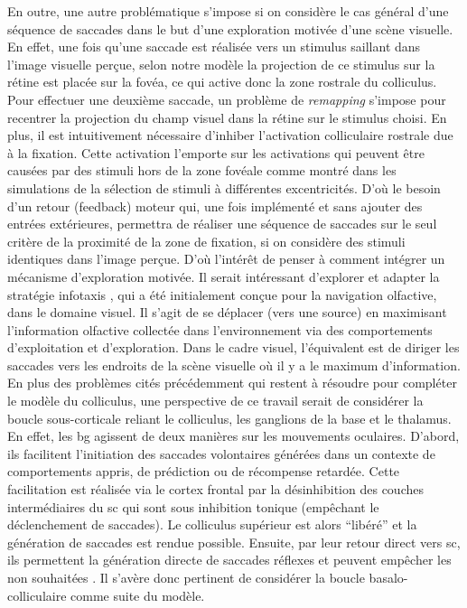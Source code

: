 En outre, une autre problématique s'impose si on considère le cas général d'une séquence de saccades dans le but d'une exploration motivée d'une scène visuelle. En effet, une fois qu'une saccade est réalisée vers un stimulus saillant dans l'image visuelle perçue, selon notre modèle la projection de ce stimulus sur la rétine est placée sur la fovéa, ce qui active donc la zone rostrale du colliculus. Pour effectuer une deuxième saccade, un problème de \textit{remapping} s'impose pour recentrer la projection du champ visuel dans la rétine sur le stimulus choisi. En plus, il est intuitivement nécessaire d'inhiber l'activation colliculaire rostrale due à la fixation. Cette activation l'emporte sur les activations qui peuvent être causées par des stimuli hors de la zone fovéale comme montré dans les simulations de la sélection de stimuli à différentes excentricités. D'o\`u le besoin d'un retour (feedback) moteur qui, une fois implémenté et sans ajouter des entrées extérieures, permettra de réaliser une séquence de saccades sur le seul critère de la proximité de la zone de fixation, si on considère des stimuli identiques dans l'image perçue. D'o\`u l'intérêt de penser à comment intégrer un mécanisme d'exploration motivée. Il serait intéressant d'explorer et adapter la stratégie infotaxis \cite{Vergassola:2007}, qui a été initialement conçue pour la navigation olfactive, dans le domaine visuel. Il s'agit de se déplacer (vers une source) en maximisant l'information olfactive collectée dans l'environnement via des comportements d'exploitation et d'exploration. Dans le cadre visuel, l'équivalent est de diriger les saccades vers les endroits de la scène visuelle o\`u il y a le maximum d'information. \\ %

En plus des problèmes cités précédemment qui restent à résoudre pour compléter le modèle du colliculus, une perspective de ce travail serait de considérer la boucle sous-corticale reliant le colliculus, les ganglions de la base et le thalamus. En effet, les \gls{bg} agissent de deux manières sur les mouvements oculaires. D'abord, ils facilitent l'initiation des saccades volontaires générées dans un contexte de comportements appris, de prédiction ou de récompense retardée. Cette facilitation est réalisée via le cortex frontal par la désinhibition des couches intermédiaires du \gls{sc} qui sont sous inhibition tonique (empêchant le déclenchement de saccades). Le colliculus supérieur est alors ``libéré'' et la génération de saccades est rendue possible. Ensuite, par leur retour direct vers \gls{sc}, ils permettent la génération directe de saccades réflexes et peuvent empêcher les non souhaitées \cite{Leigh:2006}. Il s'avère donc pertinent de considérer la boucle basalo-colliculaire comme suite du modèle.\\  %

